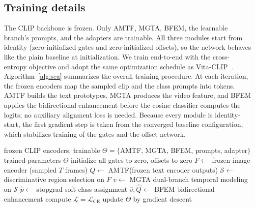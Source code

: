 \subsection{Training details}
\label{sec:training}
The CLIP backbone is frozen. Only AMTF, MGTA, BFEM, the learnable branch's prompts, and the adapters are trainable.
All three modules start from identity (zero-initialized gates and zero-initialized offsets), so the network behaves like the plain baseline at initialization.
We train end-to-end with the cross-entropy objective and adopt the same optimization schedule as Vita-CLIP~\cite{wasim2023vitaclip}.
Algorithm~\ref{alg:sea} summarizes the overall training procedure.
At each iteration, the frozen encoders map the sampled clip and the class prompts into tokens. AMTF builds the text prototypes, MGTA produces the video feature, and BFEM applies the bidirectional enhancement before the cosine classifier computes the logits; no auxiliary alignment loss is needed.
Because every module is identity-start, the first gradient step is taken from the converged baseline configuration, which stabilizes training of the gates and the offset network.

\begin{algorithm}[t]
\caption{MATE-CLIP training procedure}
\label{alg:sea}
\begin{algorithmic}[1]
\Require frozen CLIP encoders, trainable $\Theta = \{$AMTF, MGTA, BFEM, prompts, adapter$\}$
\Ensure trained parameters $\Theta$
\State initialize all gates to zero, offsets to zero
    \State $F \gets$ frozen image encoder (sampled $T$ frames)
    \State $Q \gets$ AMTF(frozen text encoder outputs) 
    \State $\mathcal{S} \gets$ discriminative region selection on $F$ 
    \State $v \gets$ MGTA dual-branch temporal modeling on $\mathcal{S}$
    \State $\hat{p} \gets$ stopgrad soft class assignment 
    \State $\hat{v}, \hat{Q} \gets$ BFEM bidirectional enhancement 
    \State compute $\mathcal{L} = \mathcal{L}_{\text{CE}}$
    \State update $\Theta$ by gradient descent
  \EndFor
\EndFor
\end{algorithmic}
\end{algorithm}

